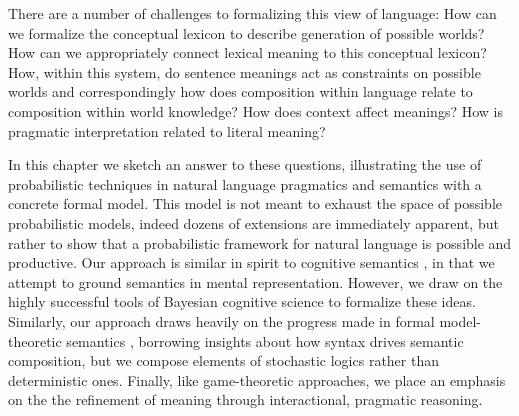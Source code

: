 \documentclass[pdfextras]{handbook}
\begin{document}
There are a number of challenges to formalizing this view of language: How can we formalize the conceptual lexicon to describe generation of possible worlds? How can we appropriately connect lexical meaning to this conceptual lexicon? How, within this system, do sentence meanings act as constraints on possible worlds and correspondingly how does composition within language relate to composition within world knowledge?  How does context affect meanings? How is pragmatic interpretation related to literal meaning?



In this chapter we sketch an answer to these questions, illustrating the use of probabilistic techniques in natural language pragmatics and semantics with a concrete formal model. This model is not meant to exhaust the space of possible probabilistic models, indeed dozens of extensions are immediately apparent, but rather to show that a probabilistic framework for natural language is possible and productive.
Our approach is similar in spirit to cognitive semantics \citep{jackendoff1983semantics,lakoff1987women}, in that we attempt to ground semantics in mental representation. However, we draw on the highly successful tools of Bayesian cognitive science to formalize these ideas. 
Similarly, our approach draws heavily on the progress made in formal model-theoretic semantics \citep{lewis70,montague1973,gamut91,heimkratzer1998}, borrowing insights about how syntax drives semantic composition, but we compose elements of stochastic logics rather than deterministic ones.
Finally, like game-theoretic approaches, we place an emphasis on the the refinement of meaning through interactional, pragmatic reasoning.
\end{document}
